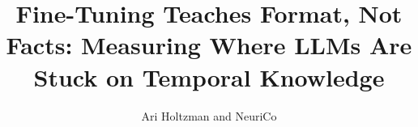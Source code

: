 \documentclass{article}
\title{Fine-Tuning Teaches Format, Not Facts: Measuring Where LLMs Are Stuck on Temporal Knowledge}
\author{Ari Holtzman and NeuriCo}
\begin{document}
\maketitle

\begin{abstract}

\end{abstract}










\end{document}
